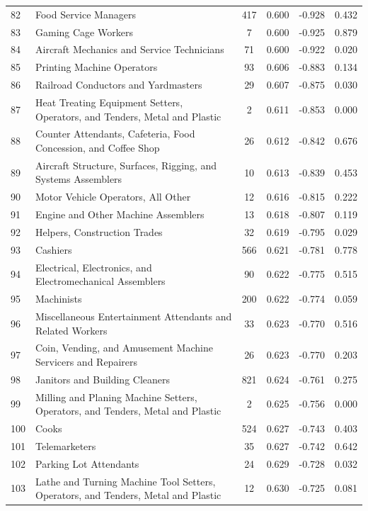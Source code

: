 {\begin{longtable}{llcccc}
 82 & Food Service Managers & 417 & 0.600 & -0.928 & 0.432 \\
 83 & Gaming Cage Workers & 7 & 0.600 & -0.925 & 0.879 \\
 84 & Aircraft Mechanics and Service Technicians & 71 & 0.600 & -0.922 & 0.020 \\
 85 & Printing Machine Operators & 93 & 0.606 & -0.883 & 0.134 \\
 86 & Railroad Conductors and Yardmasters & 29 & 0.607 & -0.875 & 0.030 \\
 87 & Heat Treating Equipment Setters, Operators, and Tenders, Metal and Plastic & 2 & 0.611 & -0.853 & 0.000 \\
 88 & Counter Attendants, Cafeteria, Food Concession, and Coffee Shop & 26 & 0.612 & -0.842 & 0.676 \\
 89 & Aircraft Structure, Surfaces, Rigging, and Systems Assemblers & 10 & 0.613 & -0.839 & 0.453 \\
 90 & Motor Vehicle Operators, All Other & 12 & 0.616 & -0.815 & 0.222 \\
 91 & Engine and Other Machine Assemblers & 13 & 0.618 & -0.807 & 0.119 \\
 92 & Helpers, Construction Trades & 32 & 0.619 & -0.795 & 0.029 \\
 93 & Cashiers & 566 & 0.621 & -0.781 & 0.778 \\
 94 & Electrical, Electronics, and Electromechanical Assemblers & 90 & 0.622 & -0.775 & 0.515 \\
 95 & Machinists & 200 & 0.622 & -0.774 & 0.059 \\
 96 & Miscellaneous Entertainment Attendants and Related Workers & 33 & 0.623 & -0.770 & 0.516 \\
 97 & Coin, Vending, and Amusement Machine Servicers and Repairers & 26 & 0.623 & -0.770 & 0.203 \\
 98 & Janitors and Building Cleaners & 821 & 0.624 & -0.761 & 0.275 \\
 99 & Milling and Planing Machine Setters, Operators, and Tenders, Metal and Plastic & 2 & 0.625 & -0.756 & 0.000 \\
 100 & Cooks & 524 & 0.627 & -0.743 & 0.403 \\
 101 & Telemarketers & 35 & 0.627 & -0.742 & 0.642 \\
 102 & Parking Lot Attendants & 24 & 0.629 & -0.728 & 0.032 \\
 103 & Lathe and Turning Machine Tool Setters, Operators, and Tenders, Metal and Plastic & 12 & 0.630 & -0.725 & 0.081 \\

\end{longtable}}
